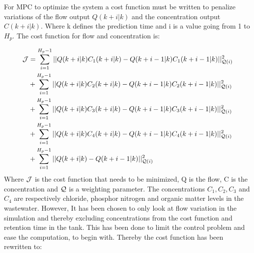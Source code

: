 

For MPC to optimize the system a cost function must be written to penalize variations of the flow output $Q(k+i|k)$ and the concentration output $C(k+i|k)$. Where k defines the prediction time and i is a value going from 1 to $H_p$. The cost function for flow and concentration is:

\begin{equation}
\begin{aligned}
	 \CMcal{J} &= \sum_{i=1}^{H_p-1} || Q(k+i|k)C_1(k+i|k)-Q(k+i-1|k)C_1(k+i-1|k)||_{\CMcal{Q}(i)}^2 \\&+\sum_{i=1}^{H_p-1} || Q(k+i|k)C_2(k+i|k)-Q(k+i-1|k)C_2(k+i-1|k)||_{\CMcal{Q}(i)}^2 \\&+\sum_{i=1}^{H_p-1} || Q(k+i|k)C_3(k+i|k)-Q(k+i-1|k)C_3(k+i-1|k)||_{\CMcal{Q}(i)}^2\\&+\sum_{i=1}^{H_p-1} || Q(k+i|k)C_4(k+i|k)-Q(k+i-1|k)C_4(k+i-1|k)||_{\CMcal{Q}(i)}^2 \\& +\sum_{i=1}^{H_p-1} || Q(k+i|k)-Q(k+i-1|k)||_{\CMcal{Q}(i)}^2
\end{aligned}	
\end{equation}
Where $\CMcal{J}$ is the cost function that needs to be minimized, Q is the flow, C is the concentration and $\CMcal{Q}$ is a weighting parameter. The concentrations $C_1, C_2, C_3$ and $C_4$ are respectively chloride, phosphor nitrogen and organic matter levels in the wastewater. However, It has been chosen to only look at flow variation in the simulation and thereby excluding concentrations from the cost function and retention time in the tank. This has been done to limit the control problem and ease the computation, to begin with. Thereby the cost function has been rewritten to: 

